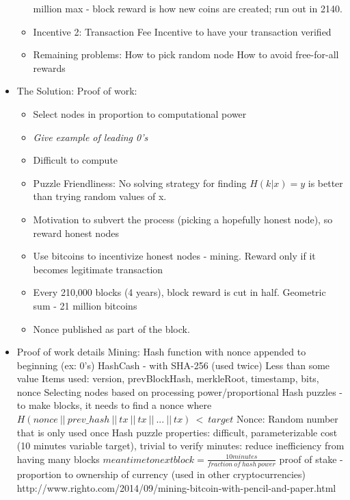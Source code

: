 \documentclass{article}
\begin{document}
\begin{itemize}
\begin{itemize}
         million max - block reward is how new coins are created; run out in 2140.
      \item Incentive 2: Transaction Fee
        \subitem Incentive to have your transaction verified
      \item Remaining problems: 
        \subitem How to pick random node
        \subitem How to avoid free-for-all rewards
    \end{itemize}
  \item The Solution: Proof of work:
    \begin{itemize}
      \item Select nodes in proportion to computational power
      \item \emph{Give example of leading 0's}
      \item Difficult to compute
      \item Puzzle Friendliness: No solving strategy for finding $H(k | x)=y$ is better than trying random values of x.
      \item Motivation to subvert the process (picking a hopefully honest node), so reward honest nodes
      \item Use bitcoins to incentivize honest nodes - mining. Reward only if it becomes legitimate transaction
      \item Every 210,000 blocks (4 years), block reward is cut in half. Geometric sum - 21 million bitcoins
      \item Nonce published as part of the block.
    \end{itemize}
  \item Proof of work details
    \subitem Mining: Hash function with nonce appended to beginning (ex: 0's)
    \subitem HashCash - with SHA-256 (used twice)
    \subitem Less than some value
    \subitem Items used: version, prevBlockHash, merkleRoot, timestamp, bits, nonce
    \subitem Selecting nodes based on processing power/proportional
    \subitem Hash puzzles - to make blocks, it needs to find a nonce where
    \subitem $ H(nonce\ ||\ prev\_hash\ ||\ tx\ ||\ tx\ ||\ ...\ ||\ tx)\ <\ target $
    \subitem Nonce: Random number that is only used once
    \subitem Hash puzzle properties: difficult, parameterizable cost (10 minutes variable target), trivial to verify
     minutes: reduce inefficiency from having many blocks
    \subitem $ mean time to next block = \frac{10 minutes}{fraction\ of\ hash\ power} $
    \subitem proof of stake - proportion to ownership of currency (used in other cryptocurrencies)
    \subitem http://www.righto.com/2014/09/mining-bitcoin-with-pencil-and-paper.html

\end{itemize}
\end{document}
